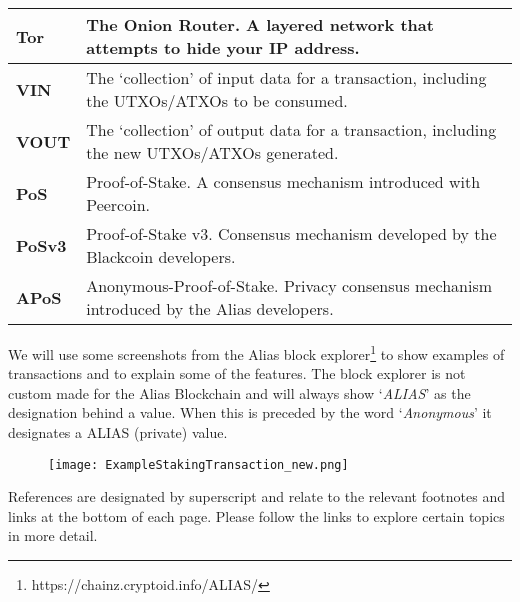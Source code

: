 \begin{table}[h]
{\begin{tabular}{@{}ll@{}}
\textbf{Tor} & The Onion Router. A layered network that attempts to hide 
your IP address. \\ 
\midrule
\textbf{VIN} & The ‘collection’ of input data for a transaction, including 
the UTXOs/ATXOs to be consumed. \\ 
\midrule
\textbf{VOUT} & The ‘collection’ of output data for a transaction, including 
the new UTXOs/ATXOs generated. \\ 
\midrule
\textbf{PoS} & Proof-of-Stake. A consensus mechanism introduced with Peercoin. \\ 
\midrule
\textbf{PoSv3} & Proof-of-Stake v3. Consensus mechanism developed by the 
Blackcoin developers. \\ 
\midrule
\textbf{APoS} & Anonymous-Proof-of-Stake. Privacy consensus mechanism 
introduced by the Alias developers. \\ 
\hline
\end{tabular}%
}
\end{table}
\newpage
\noindent
We will use some screenshots from the Alias block
explorer\footnote{https://chainz.cryptoid.info/ALIAS/} to show examples of
transactions and to explain some of the features. The block explorer
is not custom made for the Alias Blockchain and will always show ‘\textit{ALIAS}’
as the designation behind a value. When this is preceded by the word
‘\textit{Anonymous}’ it designates a ALIAS (private) value.
\begin{figure}[ht]
	\centering
	\texttt{[image: ExampleStakingTransaction\_new.png]}
\end{figure}
\noindent
References are designated by superscript and relate to the relevant
footnotes and links at the bottom of each page. Please follow the links to
explore certain topics in more detail.